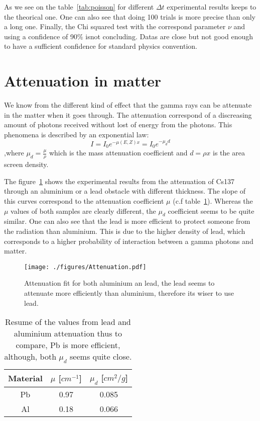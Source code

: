 \documentclass[a4paper,12pt,oneside]{article}
\begin{document}
As we see on the table~\ref{tab:poisson} for different $\Delta t$ experimental results keeps to the theorical one. One can also see that doing 100 trials is more precise than only a long one. Finally, the Chi squared test with the correspond parameter $\nu$ and using a confidence of 90$\%$ isnot concluding. Datas are close but not good enough to have a sufficient confidence for standard physics convention.

\newpage
\section{Attenuation in matter}
We know from the different kind of effect that the gamma rays can be attenuate in the matter when it goes through. The attenuation correspond of a discreasing amount of photons received without lost of energy from the photons.
This phenomena is described by an exponential law:
$$I=I_0e^{-\mu(E,Z)x}=I_0 e^{-\mu_d d}$$
,where $\mu_d=\frac{\mu}{\rho}$ which is the mass attenuation coefficient and $d=\rho x$ is the area screen density.

The figure~\ref{fig:attenuation} shows the experimental results from the attenuation of Cs137 through an aluminium or a lead obstacle with different thickness. The slope of this curves correspond to the attenuation coefficient $\mu$ (c.f table~\ref{tab:attenuation}).
Whereas the $\mu$ values of both samples are clearly different, the $\mu_d$ coefficient seems to be quite similar. One can also see that the lead is more efficient to protect someone from the radiation than aluminium. This is due to the higher density of lead, which corresponds to a higher probability of interaction between a gamma photons and matter.

\begin{figure}[h!]
	\begin{center}
	\texttt{[image: ./figures/Attenuation.pdf]}
	\caption{Attenuation fit for both aluminium an lead, the lead seems to attenuate more efficiently than aluminium, therefore its wiser to use lead.} \label{fig:attenuation}
	\end{center}
\end{figure}

\begin{table}[h!]
\centering
	\begin{tabular}{|c|c|c|}
		 \hline
		Material & $\mu$ [$cm^{-1}$] & $\mu_d$ [$cm^2/g$]\\
		\hline
		Pb	& 0.97 & 0.085 \\
		Al	& 0.18 & 0.066 \\
			\hline
	\end{tabular}
	\caption{Resume of the values from lead and aluminium attenuation thus to compare, Pb is more efficient, although, both $\mu_d$ seems quite close.}
	\label{tab:attenuation}
\end{table}
\end{document}
